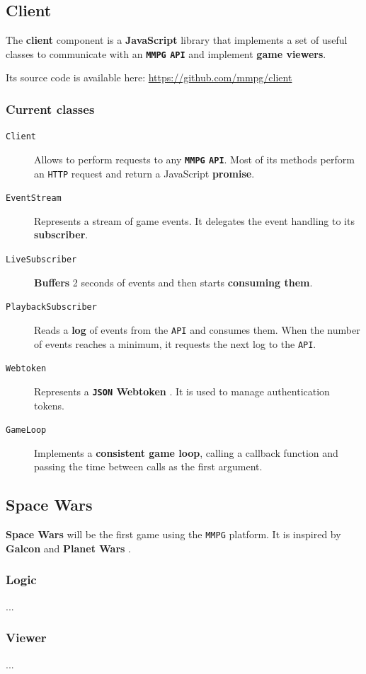\documentclass[a4paper,11pt]{article}
\begin{document}
\subsection{Client}
The \textbf{client} component is a \textbf{JavaScript} library that implements a set of useful classes to communicate with
an \textbf{\texttt{MMPG} \texttt{API}} and implement \textbf{game viewers}.

Its source code is available here: \url{https://github.com/mmpg/client}
\subsubsection{Current classes}
\begin{description}
\item[\texttt{Client}]
Allows to perform requests to any \textbf{\texttt{MMPG} \texttt{API}}. Most of its methods perform an \texttt{HTTP} request
  and return a JavaScript \textbf{promise}.
\item[\texttt{EventStream}]
Represents a stream of game events. It delegates the event handling to its \textbf{subscriber}.
\item[\texttt{LiveSubscriber}]
\textbf{Buffers} 2 seconds of events and then starts \textbf{consuming them}.
\item[\texttt{PlaybackSubscriber}]
Reads a \textbf{log} of events from the \texttt{API} and consumes them. When the number of
  events reaches a minimum, it requests the next log to the \texttt{API}.
\item[\texttt{Webtoken}]
Represents a \textbf{\texttt{JSON} Webtoken} \cite{jwt}. It is used to manage authentication tokens.
\item[\texttt{GameLoop}]
Implements a \textbf{consistent game loop}, calling a callback function and passing the time
  between calls as the first argument.
\end{description}
\subsection{Space Wars}
\textbf{Space Wars} will be the first game using the \texttt{MMPG} platform. It is inspired by \textbf{Galcon} \cite{galcon}
and \textbf{Planet Wars} \cite{planet_wars}.
\subsubsection{Logic}
...
\subsubsection{Viewer}
...
\end{document}
